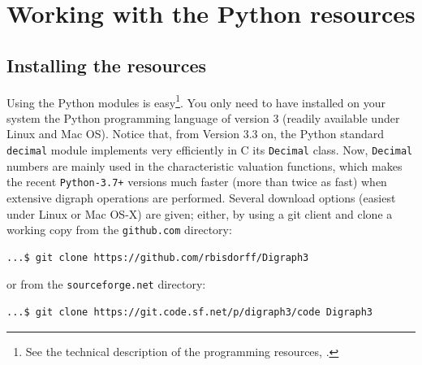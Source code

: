 %
%
%
\chapter{Working with the \Digraph Python resources}
\label{sec:1} %



\section{Installing the \Digraph resources}
\label{sec:1.1}

Using the \Digraph Python modules is easy\footnote{See the technical description of the \Digraph programming resources, \citet{BIS-2021b}.}. You only need to have installed on your system the Python programming language of version 3 (readily available under Linux and Mac OS). Notice that, from Version 3.3 on, the Python standard \texttt{decimal} module implements very efficiently in C its \texttt{Decimal} class. Now, \texttt{Decimal} numbers are mainly used in the \Digraph characteristic valuation functions, which makes the recent \texttt{Python-3.7+} versions much faster (more than twice as fast) when extensive digraph operations are performed.
Several download options (easiest under Linux or Mac OS-X) are given; either, by using a git client and clone a working copy from the \texttt{github.com} directory:
\begin{lstlisting}[language=sh, backgroundcolor=\color{White}, numbers=none]
  ...$ git clone https://github.com/rbisdorff/Digraph3
\end{lstlisting}
or from the \texttt{sourceforge.net} directory:
\begin{lstlisting}[language=sh,backgroundcolor=\color{White},numbers=none]
  ...$ git clone https://git.code.sf.net/p/digraph3/code Digraph3
\end{lstlisting}

